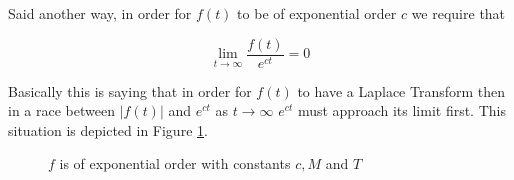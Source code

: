 \documentclass{article}
\theoremstyle{definition}
\begin{document}
\bigskip
\noindent
Said another way, in order for $f(t)$ to be of exponential order
$c$ we require that

\bigskip
\begin{equation*}
\lim\limits_{t \to \infty} \frac{f(t)}{e^{ct}} = 0
\end{equation*}

\medskip
\bigskip
\noindent
Basically this is saying that in order for $f(t)$ to have a
Laplace Transform then in a race between $|f(t)|$ and $e^{ct}$ as
$t \to \infty$ $e^{ct}$ must approach its limit first. This
situation is depicted in Figure \ref{fig:exponential_order}.

\bigskip
\bigskip
\begin{figure}[H]
\caption{$f$ is of exponential order with constants $c, M$ and $T$}
\label{fig:exponential_order}
\end{figure}
\end{document}
